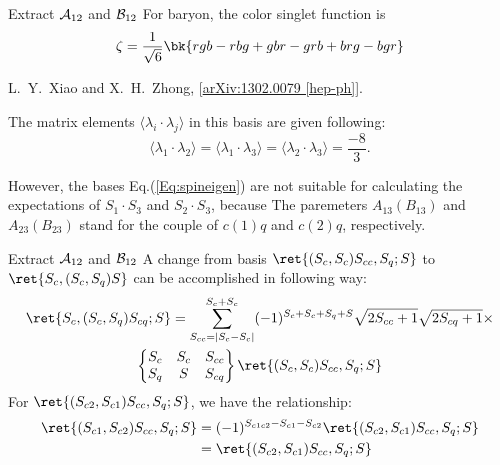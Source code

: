 \begin{frame}{Extract $\mathcal{A}_{12}$ and $\mathcal{B}_{12}$}
    For baryon, the color singlet function is
    \begin{equation}
        \zeta = \frac{1}{\sqrt{6}}\bk{rgb-rbg+gbr-grb+brg-bgr}
    \end{equation}
    \begin{thebibliography}
        \beamertemplatetextbibitems
            L.~Y.~Xiao and X.~H.~Zhong,
            [\href{https://arxiv.org/abs/1302.0079v2}{arXiv:1302.0079 [hep-ph]}].
    \end{thebibliography}
    The matrix elements $\langle\lambda_{i}\cdot\lambda_{j}\rangle$ in this basis are given following:
    \[
        \langle\lambda_{1}\cdot\lambda_{2}\rangle = \langle\lambda_{1}\cdot\lambda_{3}\rangle = \langle\lambda_{2}\cdot\lambda_{3}\rangle = \frac{-8}{3}.
    \]


    However, the bases Eq.(\ref{Eq:spineigen}) are not suitable for calculating the expectations of $S_{1}\cdot S_{3}$ and $S_{2}\cdot S_{3}$, because The paremeters $A_{13}(B_{13})$ and $A_{23}(B_{23})$ stand for the couple of $c(1)q$ and $c(2)q$, respectively.
\end{frame}
\begin{frame}{Extract $\mathcal{A}_{12}$ and $\mathcal{B}_{12}$}
 A change from basis $\ret{(S_{c},S_{c})S_{cc},S_{q};S}$ to $\ret{S_{c},(S_{c},S_{q})S}$ can be accomplished in following way:
    \begin{multline}\label{Eq:spin decomposition}
        \ret{S_{c},(S_{c},S_{q})S_{cq};S} =
        \sum_{S_{cc}=|S_{c}-S_{c}|}^{S_{c}+S_{c}}(-1)^{S_{c}+S_{c}+S_{q}+S}\sqrt{2S_{cc}+1}\sqrt{2S_{cq}+1}\times\\
        \begin{Bmatrix}
            S_{c} & S_{c} & S_{cc} \\
            S_{q} & S     & S_{cq}
        \end{Bmatrix}
        \ret{(S_{c},S_{c})S_{cc},S_{q};S}
    \end{multline}
    For $\ret{(S_{c2},S_{c1})S_{cc},S_{q};S}$, we have the relationship:
    \begin{align*}
        \ret{(S_{c1},S_{c2})S_{cc},S_{q};S} 
        &= (-1)^{S_{c1c2}-S_{c1}-S_{c2}}\ret{(S_{c2},S_{c1})S_{cc},S_{q};S}\\
        &=\ret{(S_{c2},S_{c1})S_{cc},S_{q};S}
    \end{align*}
\end{frame}
